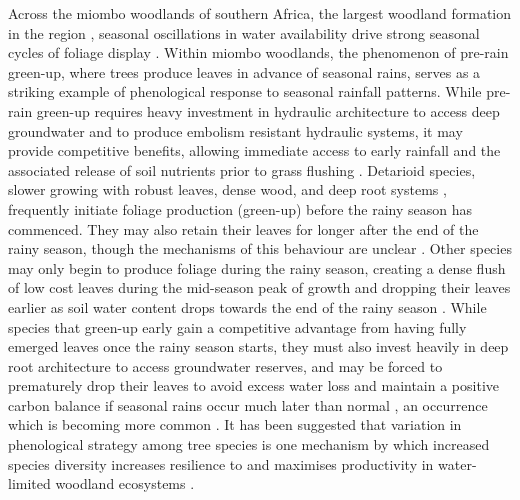 \documentclass[11pt,a4paper]{article}
\begin{document}
Across the miombo woodlands of southern Africa, the largest woodland formation
in the region \citep{White1983}, seasonal oscillations in water availability
drive strong seasonal cycles of foliage display \citep{Chidumayo2001,
Dahlin2016}. Within miombo woodlands, the phenomenon of pre-rain green-up,
where trees produce leaves in advance of seasonal rains, serves as a striking
example of phenological response to seasonal rainfall patterns. While pre-rain
green-up requires heavy investment in hydraulic architecture to access deep
groundwater and to produce embolism resistant hydraulic systems, it may provide
competitive benefits, allowing immediate access to early rainfall and the
associated release of soil nutrients prior to grass flushing \citep{Ryan2017,
February2016}. Detarioid species, slower growing with robust leaves, dense
wood, and deep root systems \citep{Zhou2020, Timberlake1993}, frequently
initiate foliage production (green-up) before the rainy season has commenced.
They may also retain their leaves for longer after the end of the rainy season,
though the mechanisms of this behaviour are unclear \citep{Giraldo2011,
Kushwaha2011}. Other species may only begin to produce foliage during the rainy
season, creating a dense flush of low cost leaves during the mid-season peak of
growth and dropping their leaves earlier as soil water content drops towards
the end of the rainy season \citep{Lasky2016}. While species that green-up
early gain a competitive advantage from having fully emerged leaves once the
rainy season starts, they must also invest heavily in deep root architecture to
access groundwater reserves, and may be forced to prematurely drop their leaves
to avoid excess water loss and maintain a positive carbon balance if seasonal
rains occur much later than normal \citep{Vinya2018}, an occurrence which is
becoming more common \citep{Wainwright2021}. It has been suggested that
variation in phenological strategy among tree species is one mechanism by which
increased species diversity increases resilience to  and maximises productivity
in water-limited woodland ecosystems \citep{Stan2019, Morellato2016}. 
\end{document}
